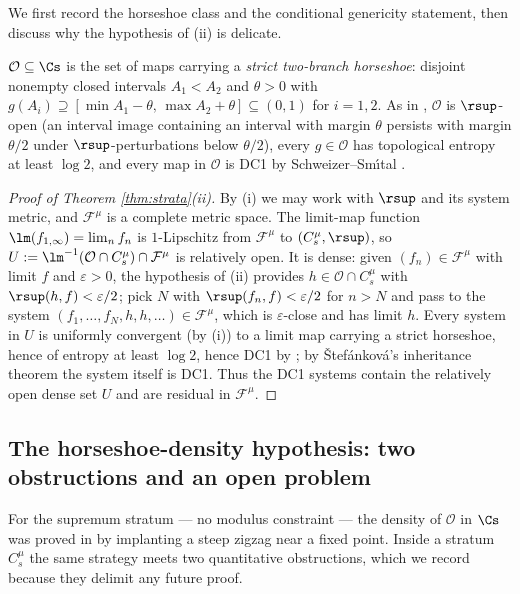 We first record the horseshoe class and the conditional genericity statement,
then discuss why the hypothesis of (ii) is delicate.

\begin{definition}\label{def:O-recall}
$\mathcal O\subseteq\Cs$ is the set of maps carrying a \emph{strict two-branch
horseshoe}: disjoint nonempty closed intervals $A_1<A_2$ and $\theta>0$ with
$g(A_i)\supseteq[\min A_1-\theta,\,\max A_2+\theta]\subseteq(0,1)$ for $i=1,2$.
As in \cite{companion}, $\mathcal O$ is $\rsup$-open (an interval image
containing an interval with margin $\theta$ persists with margin $\theta/2$
under $\rsup$-perturbations below $\theta/2$), every $g\in\mathcal O$ has
topological entropy at least $\log2$, and every map in $\mathcal O$ is DC1 by
Schweizer--Sm\'\i tal \cite{SS}.
\end{definition}

\begin{proof}[Proof of Theorem \ref{thm:strata}(ii)]
By (i) we may work with $\rsup$ and its system metric, and $\mathcal F^\mu$ is a
complete metric space.  The limit-map function
$\lm(f_{1,\infty})=\lim_nf_n$ is $1$-Lipschitz from $\mathcal F^\mu$ to
$(C^\mu_s,\rsup)$, so
$U:=\lm^{-1}(\mathcal O\cap C^\mu_s)\cap\mathcal F^\mu$ is relatively open.
It is dense: given $(f_n)\in\mathcal F^\mu$ with limit $f$ and
$\varepsilon>0$, the hypothesis of (ii) provides
$h\in\mathcal O\cap C^\mu_s$ with $\rsup(h,f)<\varepsilon/2$; pick $N$ with
$\rsup(f_n,f)<\varepsilon/2$ for $n>N$ and pass to the system
$(f_1,\dots,f_N,h,h,\dots)\in\mathcal F^\mu$, which is $\varepsilon$-close and
has limit $h$.  Every system in $U$ is uniformly convergent (by (i)) to a limit
map carrying a strict horseshoe, hence of entropy at least $\log2$, hence DC1 by
\cite{SS}; by \v Stef\'ankov\'a's inheritance theorem \cite{Stefankova} the
system itself is DC1.  Thus the DC1 systems contain the relatively open dense
set $U$ and are residual in $\mathcal F^\mu$.
\end{proof}

\subsection*{The horseshoe-density hypothesis: two obstructions and an open
problem}

For the supremum stratum --- no modulus constraint --- the density of
$\mathcal O$ in $\Cs$ was proved in \cite{companion} by implanting a steep
zigzag near a fixed point.  Inside a stratum $C^\mu_s$ the same strategy meets
two quantitative obstructions, which we record because they delimit any future
proof.

